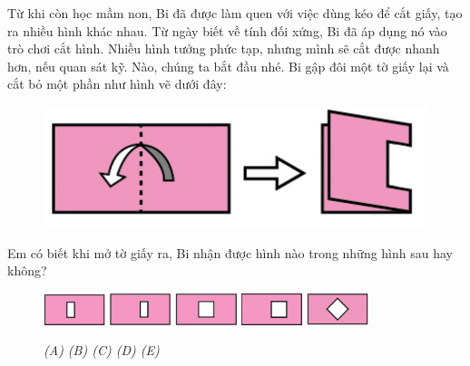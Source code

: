 \begingroup
{} %
\centering
\endgroup
\graphicspath{ {../choicungbi/gapvacathinh/} }	

\vspace*{10pt}
	
Từ khi còn học mầm non, Bi  đã được làm quen với việc dùng kéo để cắt giấy, tạo ra nhiều hình khác nhau. Từ ngày biết về tính đối xứng, Bi đã áp dụng nó vào trò chơi cắt hình.
Nhiều hình tưởng phức tạp, nhưng mình sẽ cắt được nhanh hơn, nếu quan sát kỹ.
\vskip 0.1cm
Nào, chúng ta bắt đầu nhé.
\vskip 0.1cm
Bi gập đôi một tờ giấy lại và cắt bỏ một phần như hình vẽ dưới đây: 
	\begin{figure}[H]
		\centering
		\centering
		\vspace*{-10pt}
		\includegraphics[scale=0.4]{cat-1}
		\vspace*{-10pt}
	\end{figure}
Em có biết khi mở tờ giấy ra, Bi nhận được hình nào trong những hình sau hay không?
\begin{figure}[H]
	\centering
	\captionsetup{labelformat=empty}
	\vspace*{-5pt}
	\captionsetup{justification=centering}
	\includegraphics[width =0.16\textwidth]{cat-2a.jpeg}\quad
	\includegraphics[width =0.16\textwidth]{cat-2b.jpeg}\quad
	\includegraphics[width =0.16\textwidth]{cat-2c.jpeg}\quad
	\includegraphics[width =0.16\textwidth]{cat-2d.jpeg}\quad
	\includegraphics[width =0.16\textwidth]{cat-2e}
	\caption{\small\textit{(A) \hspace*{45pt} (B) \hspace*{45pt} (C) \hspace*{45pt} (D) \hspace*{45pt} (E)}}
	\vspace*{-5pt}
\end{figure}

